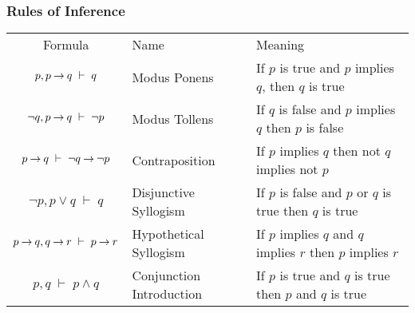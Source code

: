 
\subsubsection{Rules of Inference}


\medskip
\begin{tabular}{c l l}
\label{Tab:RulesOfInference}
  Formula          & Name                  & Meaning      \\
  
  $p, p \mathbin{\rightarrow} q \;\vdash\; q$                                  & 
  Modus Ponens                                                  & 
  If $p$ is true and $p$ implies $q$, then $q$ is true          \\   
  
  $\neg q, p \mathbin{\rightarrow} q \;\vdash\; \neg p$                        & 
  Modus Tollens                                                 & 
  If $q$ is false and $p$ implies $q$ then $p$ is false         \\     
  
  $p \mathbin{\rightarrow} q \;\vdash\; \neg q \mathbin{\rightarrow} \neg p$                   & 
  Contraposition                                                & 
  If $p$ implies $q$ then not $q$ implies not $p$               \\   
  
  $\neg p, p \vee q \;\vdash\; q$                              & 
  Disjunctive Syllogism                                         & 
  If $p$ is false and $p$ or $q$ is true then $q$ is true       \\ 
  
  $p \mathbin{\rightarrow} q,  q \mathbin{\rightarrow} r \;\vdash\; p \mathbin{\rightarrow} r$                 & 
  Hypothetical Syllogism                                        & 
  If $p$ implies $q$ and $q$ implies $r$ then $p$ implies $r$   \\   
  
  $p,q \;\vdash\; p \wedge q$                                  & 
  Conjunction Introduction                                      & 
  If $p$ is true and $q$ is true then $p$ and $q$ is true       \\ 
  

\end{tabular}
